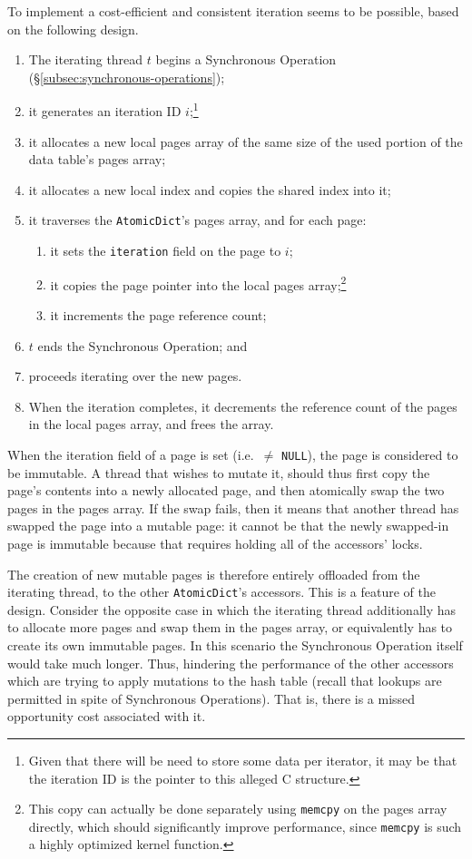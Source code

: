 To implement a cost-efficient and consistent iteration seems to be possible, based on the following design.

\begin{enumerate}
	\item The iterating thread $t$ begins a Synchronous Operation (\S\ref{subsec:synchronous-operations});
	\item it generates an iteration ID $i$;\footnote{%
		Given that there will be need to store some data per iterator, it may be that the iteration ID is the pointer to this alleged C structure.
	}
	\item it allocates a new local pages array of the same size of the used portion of the data table's pages array;
	\item it allocates a new local index and copies the shared index into it;
	\item it traverses the \texttt{AtomicDict}'s pages array, and for each page:
	\begin{enumerate}
		\item it sets the \texttt{iteration} field on the page to $i$;
		\item it copies the page pointer into the local pages array;\footnote{%
			This copy can actually be done separately using \texttt{memcpy} on the pages array directly, which should significantly improve performance, since \texttt{memcpy} is such a highly optimized kernel function.
		}
		\item it increments the page reference count;
	\end{enumerate}
	\item $t$ ends the Synchronous Operation; and
	\item proceeds iterating over the new pages.
	\item When the iteration completes, it decrements the reference count of the pages in the local pages array, and frees the array.
\end{enumerate}

When the iteration field of a page is set (i.e.\ $\neq$ \texttt{NULL}), the page is considered to be immutable.
A thread that wishes to mutate it, should thus first copy the page's contents into a newly allocated page, and then atomically swap the two pages in the pages array.
If the swap fails, then it means that another thread has swapped the page into a mutable page: it cannot be that the newly swapped-in page is immutable because that requires holding all of the accessors' locks.

The creation of new mutable pages is therefore entirely offloaded from the iterating thread, to the other \texttt{AtomicDict}'s accessors.
This is a feature of the design.
Consider the opposite case in which the iterating thread additionally has to allocate more pages and swap them in the pages array, or equivalently has to create its own immutable pages.
In this scenario the Synchronous Operation itself would take much longer.
Thus, hindering the performance of the other accessors which are trying to apply mutations to the hash table (recall that lookups are permitted in spite of Synchronous Operations).
That is, there is a missed opportunity cost associated with it.

